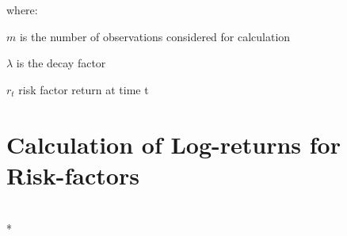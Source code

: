 \documentclass[letterpaper,10pt,english]{/anaconda/lib/python2.7/site-packages/sphinx/texinputs/sphinxhowto}
\def\smaller{\fontsize{9.5pt}{9.5pt}\selectfont}
\begin{document}
where:

$m$ is the number of observations considered for calculation

$\lambda$ is the decay factor

$r_t$ risk factor return at time t\section{Calculation of Log-returns for Risk-factors}


    
        \vspace{6pt}
        \makebox[0.1\linewidth]{\smaller\hfill\tt\color{nbframe-in-prompt}In\hspace{4pt}{[}21{]}:\hspace{4pt}}\\*
        \vspace{-2.65\baselineskip}
\end{document}
